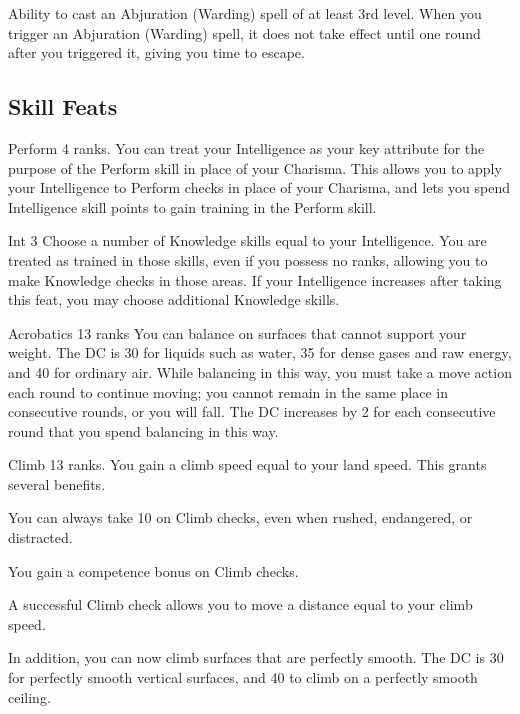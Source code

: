 \featpre Ability to cast an Abjuration (Warding) spell of at least 3rd level.
\featben When you trigger an Abjuration (Warding) spell, it does not take effect until one round after you triggered it, giving you time to escape.

\subsection{Skill Feats}

\featpre Perform 4 ranks.
\featben You can treat your Intelligence as your key attribute for the purpose of the Perform skill in place of your Charisma. This allows you to apply your Intelligence to Perform checks in place of your Charisma, and lets you spend Intelligence skill points to gain training in the Perform skill.

 Int 3
 Choose a number of Knowledge skills equal to your Intelligence. You are treated as trained in those skills, even if you possess no ranks, allowing you to make Knowledge checks in those areas. If your Intelligence increases after taking this feat, you may choose additional Knowledge skills.

\featpre Acrobatics 13 ranks
\featben You can balance on surfaces that cannot support your weight. The DC is 30 for liquids such as water, 35 for dense gases and raw energy, and 40 for ordinary air. While balancing in this way, you must take a move action each round to continue moving; you cannot remain in the same place in consecutive rounds, or you will fall. The DC increases by 2 for each consecutive round that you spend balancing in this way.

\featpre Climb 13 ranks.
\featben You gain a climb speed equal to your land speed. This grants several benefits. 
\begin{itemize*}
  \item You can always take 10 on Climb checks, even when rushed, endangered, or distracted. 
  \item You gain a  competence bonus on Climb checks.
  \item A successful Climb check allows you to move a distance equal to your climb speed.
\end{itemize*}

In addition, you can now climb surfaces that are perfectly smooth. The DC is 30 for perfectly smooth vertical surfaces, and 40 to climb on a perfectly smooth ceiling.

